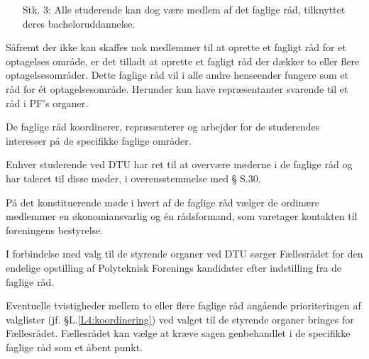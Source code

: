 \begin{list}
\begin{itemize}
	\item[Stk. 3:] Alle studerende kan dog være medlem af det faglige råd, tilknyttet deres bacheloruddannelse.

\end{itemize}

\item \label{L4:flereraad} Såfremt der ikke kan skaffes nok medlemmer til at oprette et fagligt råd for et optagelses område, er det tilladt at oprette et fagligt råd der dækker to eller flere optagelsesområder. Dette faglige råd vil i alle andre henseender fungere som et råd for ét optagelsesområde. Herunder kun have repræsentanter svarende til et råd i PF’s organer.

\item \label{L4:koordinering} De faglige råd koordinerer, repræsenterer og arbejder for de studerendes interesser på de specifikke faglige områder.

\item Enhver studerende ved DTU har ret til at overvære møderne i de faglige råd og har taleret til disse møder, i overensstemmelse med § S.30.

\item På det konstituerende møde i hvert af de faglige råd vælger de ordinære medlemmer en økonomiansvarlig og én rådsformand, som varetager kontakten til foreningens bestyrelse.

\item I forbindelse med valg til de styrende organer ved DTU sørger Fællesrådet for den endelige opstilling af Polyteknisk Forenings kandidater efter indstilling fra de faglige råd.

\item Eventuelle tvistigheder mellem to eller flere faglige råd angående prioriteringen af valglister (jf. §L.\ref{L4:koordinering}) ved valget til de styrende organer bringes for Fællesrådet. Fællesrådet kan vælge at kræve sagen genbehandlet i de specifikke faglige råd som et åbent punkt.




\end{list}
